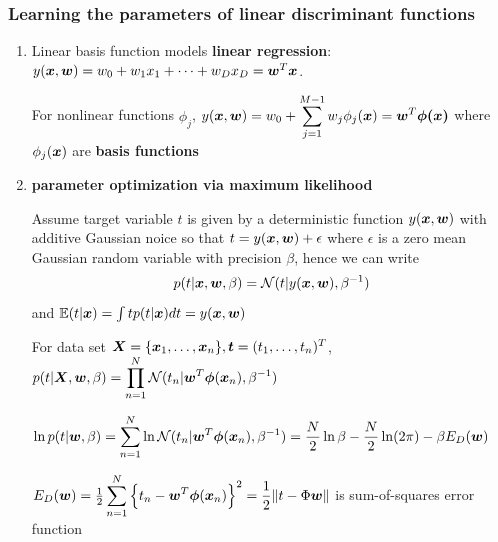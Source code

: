 \documentclass[11pt]{article}
\begin{document}
\subsubsection{Learning the parameters of linear discriminant functions}
\label{sec:orgde471de}
\begin{enumerate}
\item Linear basis function models
\label{sec:org308ad5d}
\textbf{linear regression}:
\(y(\boldsymbol{x},\boldsymbol{w})=w_0+w_1x_1+\dots+w_Dx_D=\boldsymbol{w}^T\boldsymbol{x}\).

For nonlinear functions \(\phi_j\),
\(y(\boldsymbol{x},\boldsymbol{w})=w_0+\displaystyle\sum_{j=1}^{M-1}
     w_j\phi_j(\boldsymbol{x})=\boldsymbol{w}^T\boldsymbol{\phi(\boldsymbol{x})}\) where \(\phi_j(\boldsymbol{x})\) are
\textbf{basis functions} 
\item \textbf{parameter optimization via maximum likelihood}
\label{sec:org05d6bc2}

Assume target variable \(t\) is given by a deterministic function
\(y(\boldsymbol{x},\boldsymbol{w})\) with additive Gaussian noice so that
\(t=y(\boldsymbol{x},\boldsymbol{w})+\epsilon\) where \(\epsilon\) is a zero mean Gaussian
random variable with precision \(\beta\), hence we can write
\begin{equation*}
p(t|\boldsymbol{x},\boldsymbol{w},\beta)=\mathcal{N}(t|y(\boldsymbol{x},\boldsymbol{w}),\beta^{-1})
\end{equation*}
and \(\mathbb{E}(t|\boldsymbol{x})=\int tp(t|\boldsymbol{x})dt=y(\boldsymbol{x},\boldsymbol{w})\)

For data set \(\boldsymbol{X}=\{\boldsymbol{x}_1,\dots,\boldsymbol{x}_n\},\boldsymbol{t}=(t_1,\dots,t_n)^T\),
\(p(t|\boldsymbol{X},\boldsymbol{w},\beta)=\displaystyle\prod_{n=1}^N\mathcal{N}(t_n|
     \boldsymbol{w}^T\boldsymbol{\phi}(\boldsymbol{x}_n),\beta^{-1})\)

\(\ln p(t|\boldsymbol{w},\beta)=\displaystyle\sum_{n=1}^N\ln\mathcal{N}(t_n|
     \boldsymbol{w}^T\boldsymbol{\phi}(\boldsymbol{x}_n),\beta^{-1})=\frac{N}{2}\ln\beta-\frac{N}{2}\ln(2\pi)-
     \beta E_D(\boldsymbol{w})\)

\(E_D(\boldsymbol{w})=\frac{1}{2}\displaystyle\sum_{n=1}^N
     \left\{t_n-\boldsymbol{w}^T\boldsymbol{\phi}(\boldsymbol{x}_n)\right\}^2=
     \frac{1}{2}\norm{t-\Phi\boldsymbol{w}}\) is sum-of-squares error function


\end{enumerate}
\end{document}
